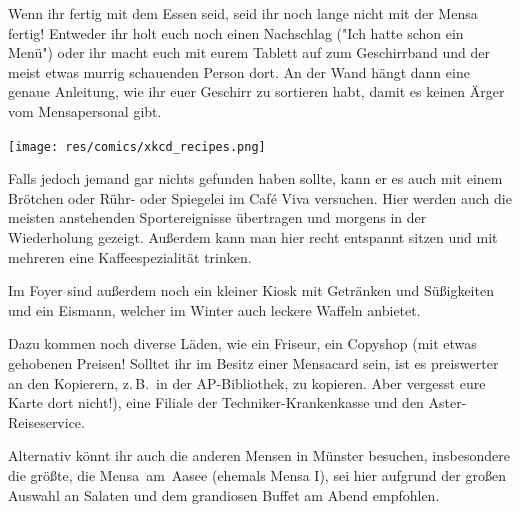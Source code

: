 \begin{multicols*}{2}
Wenn ihr fertig mit dem Essen seid, seid ihr noch lange nicht mit der Mensa fertig! Entweder ihr holt euch noch einen Nachschlag ("Ich hatte schon ein Menü") oder ihr macht euch mit eurem Tablett auf zum Geschirrband und der meist etwas murrig schauenden Person dort. An der Wand hängt dann eine genaue Anleitung, wie ihr euer Geschirr zu sortieren habt, damit es keinen Ärger vom Mensapersonal gibt.

\texttt{[image: res/comics/xkcd\_recipes.png]}

Falls jedoch jemand gar nichts gefunden haben sollte, kann er es auch mit einem Brötchen oder Rühr- oder Spiegelei im Café Viva versuchen. Hier werden auch die meisten anstehenden Sportereignisse übertragen und morgens in der Wiederholung gezeigt. Außerdem kann man hier recht entspannt sitzen und mit mehreren eine Kaffeespezialität trinken.

Im Foyer sind außerdem noch ein kleiner Kiosk mit Getränken und Süßigkeiten und ein Eismann, welcher im Winter auch leckere Waffeln anbietet.

Dazu kommen noch diverse Läden, wie ein Friseur, ein Copyshop (mit etwas gehobenen Preisen! Solltet ihr im Besitz einer Mensacard sein, ist es preiswerter an den Kopierern, z.\,B.\ in der AP-Bibliothek, zu kopieren. Aber vergesst eure Karte dort nicht!), eine Filiale der Techniker-Krankenkasse und den Aster-Reiseservice.

Alternativ könnt ihr auch die anderen Mensen in Münster besuchen, insbesondere die größte, die Mensa~am~Aasee (ehemals Mensa I), sei hier aufgrund der großen Auswahl an Salaten und dem grandiosen Buffet am Abend empfohlen. 

\end{multicols*}
